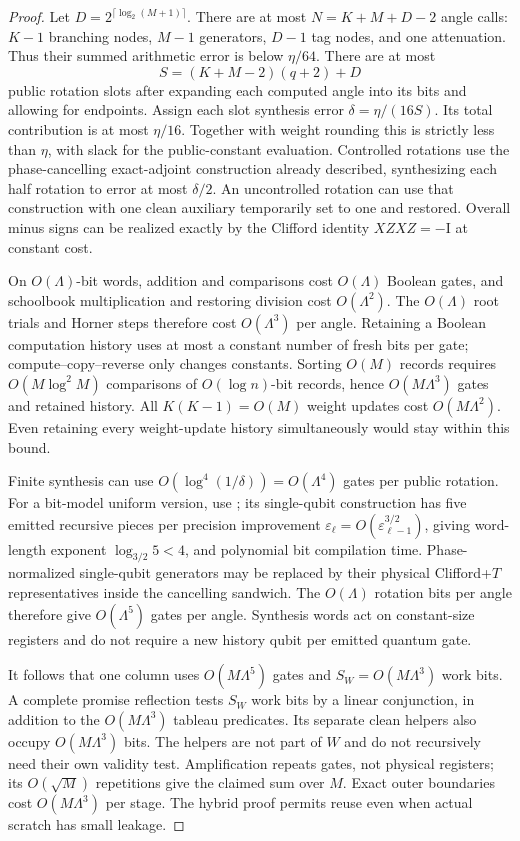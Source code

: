 \documentclass[11pt]{article}
\theoremstyle{definition}
\newcommand{\Id}{\mathrm I}
\begin{document}
\begin{proof}
Let $D=2^{\lceil\log_2(M+1)\rceil}$. There are at most
$N=K+M+D-2$ angle calls: $K-1$ branching nodes, $M-1$ generators,
$D-1$ tag nodes, and one attenuation. Thus their summed arithmetic error
is below $\eta/64$. There are at most
\[
 S=(K+M-2)(q+2)+D
\]
public rotation slots after expanding each computed angle into its bits
and allowing for endpoints. Assign each slot synthesis error
$\delta=\eta/(16S)$. Its total contribution is at most $\eta/16$.
Together with weight rounding this is strictly less than $\eta$, with
slack for the public-constant evaluation. Controlled rotations use the
phase-cancelling exact-adjoint construction already described, synthesizing
each half rotation to error at most $\delta/2$. An
uncontrolled rotation can use that construction with one clean auxiliary
temporarily set to one and restored. Overall minus signs can be realized
exactly by the Clifford identity $XZXZ=-\Id$ at constant cost.

On $O(\Lambda)$-bit words, addition and comparisons cost $O(\Lambda)$
Boolean gates, and schoolbook multiplication and restoring division cost
$O(\Lambda^2)$. The $O(\Lambda)$ root trials and Horner steps therefore
cost $O(\Lambda^3)$ per angle. Retaining a Boolean computation history
uses at most a constant number of fresh bits per gate; compute--copy--reverse
only changes constants. Sorting $O(M)$ records requires
$O(M\log^2 M)$ comparisons of $O(\log n)$-bit records, hence
$O(M\Lambda^3)$ gates and retained history. All $K(K-1)=O(M)$ weight
updates cost $O(M\Lambda^2)$. Even retaining every weight-update history
simultaneously would stay within this bound.

Finite synthesis can use $O(\log^4(1/\delta))=O(\Lambda^4)$ gates per
public rotation. For a bit-model uniform version, use \cite{mw}; its
single-qubit construction has five emitted recursive pieces per precision
improvement $\varepsilon_{\ell}=O(\varepsilon_{\ell-1}^{3/2})$, giving
word-length exponent $\log_{3/2}5<4$, and polynomial bit compilation
time. Phase-normalized single-qubit generators may be replaced by their
physical Clifford+$T$ representatives inside the cancelling sandwich.
The $O(\Lambda)$ rotation bits per angle therefore give $O(\Lambda^5)$
gates per angle. Synthesis words act on constant-size registers and do
not require a new history qubit per emitted quantum gate.

It follows that one column uses $O(M\Lambda^5)$ gates and
$S_W=O(M\Lambda^3)$ work bits. A complete promise reflection tests
$S_W$ work bits by a linear conjunction, in addition to the
$O(M\Lambda^3)$ tableau predicates. Its separate clean helpers also
occupy $O(M\Lambda^3)$ bits. The helpers are not part of $W$ and do
not recursively need their own validity test. Amplification repeats gates,
not physical registers; its $O(\sqrt M)$ repetitions give the claimed
sum over $M$. Exact outer boundaries cost $O(M\Lambda^3)$ per stage.
The hybrid proof permits reuse even when actual scratch has small leakage.


\end{proof}
\end{document}
